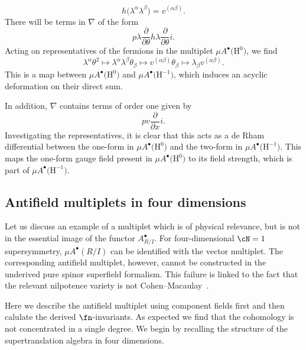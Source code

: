 \documentclass[10pt,a4paper]{amsart}
\numberwithin{equation}{section}
\def\bu{\bullet}
\begin{document}
\begin{eg}
\begin{equation*}
	h\big(\lambda^\alpha \lambda^\beta\big) = v^{(\alpha \beta)} .
	\end{equation*}
	There will be terms in $\nabla$ of the form
	\begin{equation*}
	p \lambda \frac{\partial}{\partial \theta} h \lambda \frac{\partial}{\partial \theta} i .
	\end{equation*}
	Acting on representatives of the fermions in the multiplet $\mu A^\bullet\big(\mathrm H^0\big)$, we find
	\begin{equation*}
	\lambda^\alpha \theta^2 \mapsto \lambda^\alpha \lambda^\beta \theta_\beta \mapsto v^{(\alpha \beta)} \theta_{\beta} \mapsto \lambda_{\beta} v^{(\alpha \beta)}.
	\end{equation*}
	This is a map between $\mu A^\bu\big(\mathrm H^0\big)$ and $\mu A^\bu\big(\mathrm H^{-1}\big)$, which induces an acyclic deformation on their direct sum.
	
	In addition, $\nabla$ contains terms of order one given by
	\begin{equation*}
	p v \frac{\partial}{\partial x} i .
	\end{equation*}
	Investigating the representatives, it is clear that this acts as a de Rham differential between the one-form in $\mu A^\bu\big(\mathrm H^0\big)$ and the two-form in $\mu A^\bu\big(\mathrm H^{-1}\big)$. This maps the one-form gauge field present in $\mu A^\bu\big(\mathrm H^0\big)$ to its field strength, which is part of $\mu A^\bu\big(\mathrm H^{-1}\big)$.
	
\end{eg}

\subsection{Antifield multiplets in four dimensions} \label{sec: vector anti}

Let us discuss an example of a multiplet which is of physical relevance, but is not in the essential image of the functor $A^\bullet_{R/I}$. For four-dimensional $\cN=1$ supersymmetry, $\mu A^\bullet(R/I)$ can be identified with the vector multiplet. The corresponding antifield multiplet, however, cannot be constructed in the underived pure spinor superfield formalism. This failure is linked to the fact that the relevant nilpotence variety is not Cohen--Macaulay~\cite{perspectives}.

Here we describe the antifield multiplet using component fields first and then calulate the derived $\fn$-invariants. As expected we find that the cohomology is not concentrated in a single degree. We begin by recalling the structure of the supertranslation algebra in four dimensions.
\end{document}
